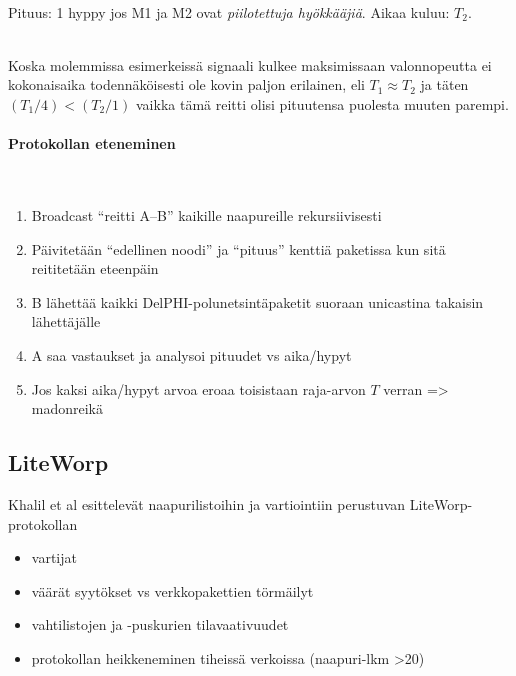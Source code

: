 \documentclass[finnish]{tktltiki2}
\theoremstyle{definition}
\theoremstyle{remark}
\begin{document}
\noindent \\
Pituus: 1 hyppy jos M1 ja M2 ovat \emph{piilotettuja hyökkääjiä}. Aikaa kuluu: $T_2$.

\noindent \\
Koska molemmissa esimerkeissä signaali kulkee maksimissaan valonnopeutta ei kokonaisaika todennäköisesti ole kovin paljon erilainen, eli $T_1 \approx T_2$ ja täten $(T_1 / 4) < (T_2 / 1)$ vaikka tämä reitti olisi pituutensa puolesta muuten parempi.

\paragraph{Protokollan eteneminen}
\noindent \\

\begin{enumerate}
\item Broadcast ``reitti A--B'' kaikille naapureille rekursiivisesti
\item Päivitetään ``edellinen noodi'' ja ``pituus'' kenttiä paketissa kun sitä reititetään eteenpäin
\item B lähettää kaikki DelPHI-polunetsintäpaketit suoraan unicastina takaisin lähettäjälle
\item A saa vastaukset ja analysoi pituudet vs aika/hypyt
\item Jos kaksi aika/hypyt arvoa eroaa toisistaan raja-arvon $T$ verran => madonreikä
\end{enumerate}

\subsection{LiteWorp}

Khalil et al esittelevät naapurilistoihin ja vartiointiin perustuvan LiteWorp-protokollan \cite{liteworp}

\begin{itemize}
\item vartijat
\item väärät syytökset vs verkkopakettien törmäilyt
\item vahtilistojen ja -puskurien tilavaativuudet
\item protokollan heikkeneminen tiheissä verkoissa (naapuri-lkm >20)
\end{itemize}

%
%
%
\newpage

%






% 
\end{document}

